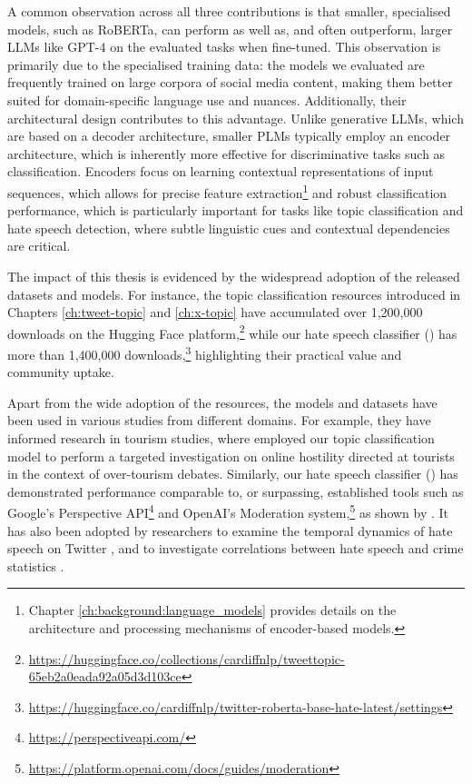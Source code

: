 A common observation across all three contributions is that smaller, specialised models, such as RoBERTa, can perform as well as, and often outperform, larger \acp{LLM} like GPT-4 on the evaluated tasks when fine-tuned. This observation is primarily due to the specialised training data: the models we evaluated are frequently trained on large corpora of social media content, making them better suited for domain-specific language use and nuances. Additionally, their architectural design contributes to this advantage. Unlike generative \acp{LLM}, which are based on a decoder architecture, smaller \acp{PLM} typically employ an encoder architecture, which is inherently more effective for discriminative tasks such as classification. Encoders focus on learning contextual representations of input sequences, which allows for precise feature extraction\footnote{Chapter \ref{ch:background:language_models} provides details on the architecture and processing mechanisms of encoder-based models.} and robust classification performance, which is particularly important for tasks like topic classification and hate speech detection, where subtle linguistic cues and contextual dependencies are critical.

The impact of this thesis is evidenced by the widespread adoption of the released datasets and models. For instance, the topic classification resources introduced in Chapters \ref{ch:tweet-topic} and \ref{ch:x-topic} have accumulated over 1,200,000 downloads on the Hugging Face platform,\footnote{\url{https://huggingface.co/collections/cardiffnlp/tweettopic-65eb2a0eada92a05d3d103ce}} while our hate speech classifier () has more than 1,400,000 downloads,\footnote{\url{https://huggingface.co/cardiffnlp/twitter-roberta-base-hate-latest/settings}} highlighting their practical value and community uptake.

Apart from the wide adoption of the resources, the models and datasets have been used in various studies from different domains. For example, they have informed research in tourism studies, where \citet{lee2025framing} employed our topic classification model to perform a targeted investigation on online hostility directed at tourists in the context of over-tourism debates. Similarly, our hate speech classifier () has demonstrated performance comparable to, or surpassing, established tools such as Google’s Perspective API\footnote{\url{https://perspectiveapi.com/}} and OpenAI’s Moderation system,\footnote{\url{https://platform.openai.com/docs/guides/moderation}} as shown by \citet{shen2025hatebench}. It has also been adopted by researchers to examine the temporal dynamics of hate speech on Twitter \cite{arun2024x}, and to investigate correlations between hate speech and crime statistics \cite{bicakci2025big}.

